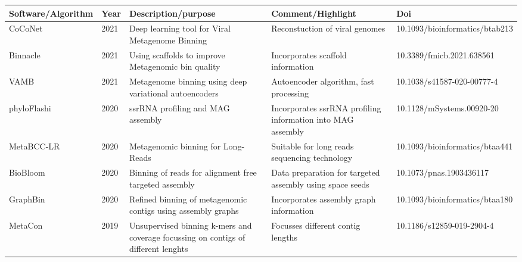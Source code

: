 \begin{tabular}{p{2cm}|p{0.6cm}|p{4cm}|p{4cm}|p{3.4cm}}
\toprule
                           Software/Algorithm &  Year &                                                                       Description/purpose &                                                               Comment/Highlight &                            Doi \\
\midrule
      CoCoNet \cite{arisdakessian2021coconet} &  2021 &                                           Deep learning tool for Viral Metagenome Binning &                                                  Reconstuction of viral genomes & 10.1093/bioinformatics/btab213 \\
     Binnacle \cite{Muralidharah2021binnacle} &  2021 &                                        Using scaffolds to improve Metagenomic bin quality &                                               Incorporates scaffold information &      10.3389/fmicb.2021.638561 \\
                   VAMB \cite{nissenimproved} &  2021 &                                    Metagenome binning using deep variational autoencoders &                                         Autoencoder algorithm, fast processing  &     10.1038/s41587-020-00777-4 \\
      phyloFlashi \cite{Harald2020phyloflash} &  2020 &                                                         ssrRNA profiling and MAG assembly &                     Incorporates ssrRNA profiling information into MAG assembly &      10.1128/mSystems.00920-20 \\
 MetaBCC-LR \cite{wickramarachchi2020metabcc} &  2020 &                                                        Metagenomic binning for Long-Reads &                                   Suitable for long reads sequencing technology & 10.1093/bioinformatics/btaa441 \\
            BioBloom \cite{ToolsChu2020bloom} &  2020 &                                     Binning of reads for alignment free targeted assembly &                        Data preparation for targeted assembly using space seeds &        10.1073/pnas.1903436117 \\
  GraphBin \cite{mallawaarachchi2020graphbin} &  2020 &                              Refined binning of metagenomic contigs using assembly graphs &                                         Incorporates assembly graph information & 10.1093/bioinformatics/btaa180 \\
               MetaCon \cite{Qian2019metacon} &  2019 &        Unsupervised binning k-mers and coverage focussing on contigs of different lenghts &                                               Focusses different contig lengths &      10.1186/s12859-019-2904-4 \\

\end{tabular}
